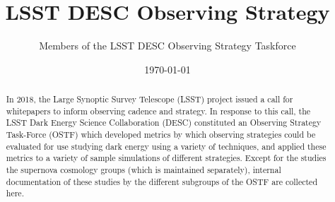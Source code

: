 \documentclass[modern]{lsstdescnote}
\begin{document}
\title{LSST DESC Observing Strategy}
\author{Members of the LSST DESC Observing Strategy Taskforce}
\date{\today}

\maketitle

\begin{abstract}
In 2018, the Large Synoptic Survey Telescope (LSST) project issued a
call for whitepapers to inform observing cadence and strategy. In
response to this call, the LSST Dark Energy Science Collaboration
(DESC) constituted an Observing Strategy Task-Force (OSTF) which
developed metrics by which observing strategies could be evaluated for
use studying dark energy using a variety of techniques, and applied
these metrics to a variety of sample simulations of different
strategies. Except for the studies the supernova cosmology groups
(which is maintained separately), internal documentation of these
studies by the different subgroups of the OSTF are collected here.
\end{abstract}

\pagebreak
\tableofcontents

\pagebreak


\pagebreak


\pagebreak

\pagebreak

\pagebreak

\pagebreak

\pagebreak


% 

\pagebreak

\pagebreak

\pagebreak

% 



\end{document}
